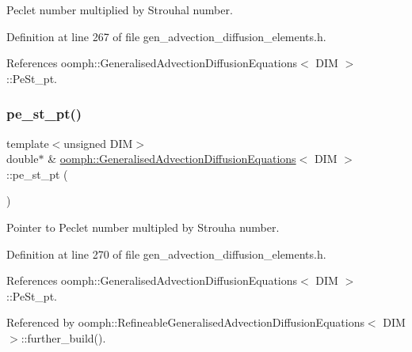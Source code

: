 Peclet number multiplied by Strouhal number. 



Definition at line 267 of file gen\+\_\+advection\+\_\+diffusion\+\_\+elements.\+h.



References oomph\+::\+Generalised\+Advection\+Diffusion\+Equations$<$ D\+I\+M $>$\+::\+Pe\+St\+\_\+pt.

\mbox{\label{classoomph_1_1GeneralisedAdvectionDiffusionEquations_ad380b81d292da4bfe1f9c7995dce7318}} 
\subsubsection{\texorpdfstring{pe\+\_\+st\+\_\+pt()}{pe\_st\_pt()}}
{\footnotesize\ttfamily template$<$unsigned D\+IM$>$ \\
double$\ast$ \& \hyperlink{classoomph_1_1GeneralisedAdvectionDiffusionEquations}{oomph\+::\+Generalised\+Advection\+Diffusion\+Equations}$<$ D\+IM $>$\+::pe\+\_\+st\+\_\+pt (\begin{DoxyParamCaption}{ }\end{DoxyParamCaption})\hspace{0.3cm}{\ttfamily [inline]}}



Pointer to Peclet number multipled by Strouha number. 



Definition at line 270 of file gen\+\_\+advection\+\_\+diffusion\+\_\+elements.\+h.



References oomph\+::\+Generalised\+Advection\+Diffusion\+Equations$<$ D\+I\+M $>$\+::\+Pe\+St\+\_\+pt.



Referenced by oomph\+::\+Refineable\+Generalised\+Advection\+Diffusion\+Equations$<$ D\+I\+M $>$\+::further\+\_\+build().

\mbox{\label{classoomph_1_1GeneralisedAdvectionDiffusionEquations_a77d006ee2f3f4097ad74b180366ddc77}} 
